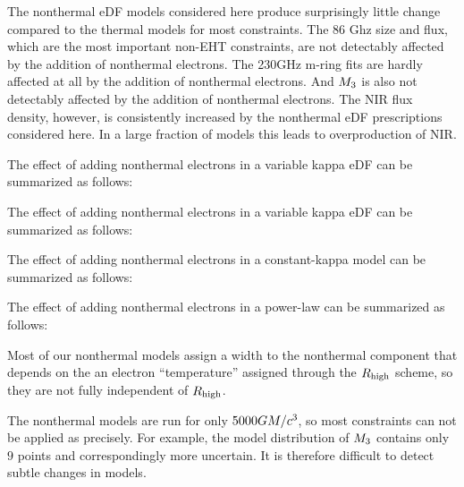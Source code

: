 The nonthermal eDF models considered here produce surprisingly little change compared to the thermal models for most constraints.  The 86 Ghz size and flux, which are the most important non-EHT constraints, are not detectably affected by the addition of nonthermal electrons.  The 230GHz m-ring fits are hardly affected at all by the addition of nonthermal electrons.  And $M_{3}$ is also not detectably affected by the addition of nonthermal electrons.  The NIR flux density, however, is consistently increased by the nonthermal eDF prescriptions considered here.  In a large fraction of models this leads to overproduction of NIR.


The effect of adding nonthermal electrons in a variable kappa eDF can be summarized as follows:

The effect of adding nonthermal electrons in a variable kappa eDF can be summarized as follows:

The effect of adding nonthermal electrons in a constant-kappa model can be summarized as follows:

The effect of adding nonthermal electrons in a power-law can be summarized as follows:

Most of our nonthermal models assign a width to the nonthermal component that depends on the an electron ``temperature'' assigned through the $R_\mathrm{high}$ scheme, so they are not fully independent of $R_\mathrm{high}$.

The nonthermal models are run for only $5000GM/c^3$, so most  constraints can not be applied as precisely.  For example, the model distribution of $M_{3}$ contains only $9$ points and correspondingly more uncertain.  It is therefore difficult to detect subtle changes in models.

